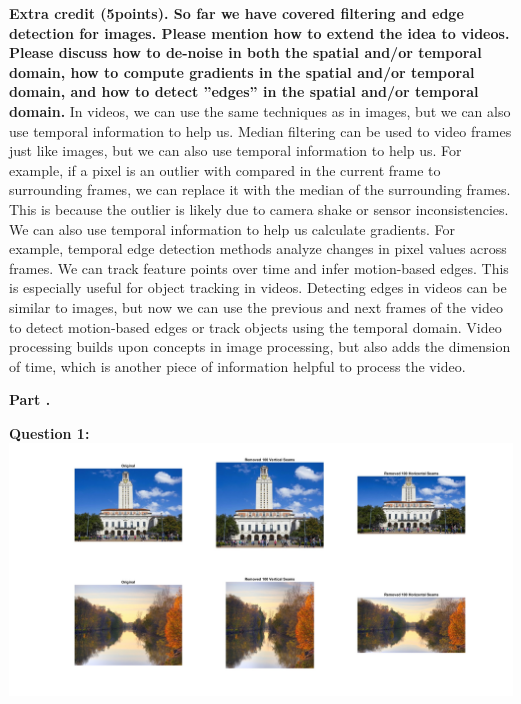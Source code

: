 \documentclass[11pt]{article}
\begin{document}
    \textbf{Extra credit (5points). So far we have covered filtering and edge detection for images. Please mention how to extend the idea to videos.
    Please discuss how to de-noise in both the spatial and/or temporal domain, how to compute gradients in the spatial and/or temporal domain,
        and how to detect ”edges” in the spatial and/or temporal domain.}\newline
    In videos, we can use the same techniques as in images, but we can also use temporal information to help us. Median filtering can be used to
    video frames just like images, but we can also use temporal information to help us. For example, if a pixel is an outlier with compared in the
    current frame to surrounding frames, we can replace it with the median of the surrounding frames. This is because the outlier is likely due to
    camera shake or sensor inconsistencies. We can also use temporal information to help us calculate gradients. For example, temporal edge
    detection methods analyze changes in pixel values across frames. We can track feature points over time and infer motion-based edges. This is
    especially useful for object tracking in videos. Detecting edges in videos can be similar to images, but now we can use the previous and
    next frames of the video to detect motion-based edges or track objects using the temporal domain. Video processing builds upon concepts in image
    processing, but also adds the dimension of time, which is another piece of information helpful to process the video.\newline

    \textbf{Part .}\newline
    
    \textbf{Question 1:}\newline
    \includegraphics[width=\linewidth]{Part 2 Pictures/question1}\newline
\end{document}
